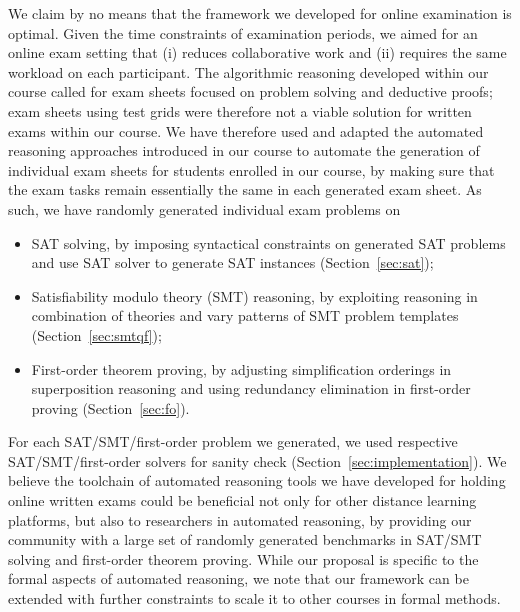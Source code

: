 We claim by no means that the framework we developed for online
examination is optimal.
Given the time constraints of examination periods, we aimed for an
online exam setting that (i) reduces collaborative work and  (ii)
requires the same workload on each participant.
The algorithmic reasoning developed within our
course called for exam sheets focused on problem solving and deductive
proofs;  exam sheets using test grids were therefore not a viable solution
for written exams within our course.
We have therefore used and adapted the automated reasoning approaches introduced in our
course to automate the generation of individual exam sheets for
students enrolled in our course, by making sure that the exam tasks
remain essentially the same in each generated exam sheet. As such, we have randomly generated
individual exam problems on 
\begin{itemize}
\item SAT solving, by imposing syntactical constraints on generated
  SAT problems and use SAT solver to generate SAT instances (Section~\ref{sec:sat}); 
\item Satisfiability modulo theory (SMT) reasoning, by exploiting reasoning in combination of theories
  and vary patterns of SMT problem templates (Section~\ref{sec:smtqf}); 
\item First-order theorem proving, by adjusting simplification
  orderings in superposition reasoning and using redundancy elimination
  in first-order proving (Section~\ref{sec:fo}). 
\end{itemize}
For each SAT/SMT/first-order problem we generated, we used respective
SAT/SMT/first-order solvers for sanity check (Section~\ref{sec:implementation}).
We believe the toolchain of automated reasoning tools we have developed for
holding online written exams could be beneficial not only for other
distance learning platforms, but also to researchers in automated
reasoning, by providing our community with a large set of randomly generated benchmarks in SAT/SMT solving and first-order theorem proving.
While our proposal is specific to the formal aspects of automated
reasoning, we note that  our framework can be extended with further
constraints to scale it to other courses in formal methods. 


